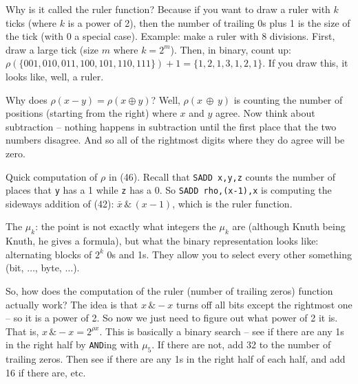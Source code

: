 \vskip 0.08in \noindent [p 140] Why is it called the ruler function?\hfil\break
Because if you want to draw a ruler with $k$ ticks (where $k$ is
a power of 2), then the number of trailing 0s plus 1 is the size of the
tick (with 0 a special case).  Example: make a ruler with 8
divisions. First, draw a large tick (size $m$ where $k = 2^m$).  
Then, in binary, count up:
$\rho\left(\{001, 010, 011, 100, 101, 110, 111\}\right) + 1 = 
\{1, 2, 1, 3, 1, 2, 1\}$.  If you draw this, it looks like, well,
a ruler. 

\vskip 0.08in \noindent [p 140] Why does $\rho\left(x - y\right) = 
\rho\left(x \oplus y \right)$? \hfil\break
Well, $\rho \left(x \, \oplus \, y\right)$ is counting the number of
positions (starting from the right) where $x$ and $y$ agree.
Now think about subtraction -- nothing happens in subtraction
until the first place that the two numbers disagree.  And so
all of the rightmost digits where they do agree will be zero.

\vskip 0.08in \noindent [p 141] Quick computation of $\rho$ in (46).
\hfil\break
Recall that {\tt SADD x,y,z} counts the number of places that
{\tt y} has a 1 while {\tt z} has a 0.  So {\tt SADD rho,(x-1),x}
is computing the sideways addition of (42): $\bar x \, \& \, 
\left(x - 1\right)$, which is the ruler function.

\vskip 0.08in \noindent [p 141] The $\mu_k$: the point is not 
exactly what integers the $\mu_k$ are (although Knuth being
Knuth, he gives a formula), but what the binary representation
looks like: alternating blocks of $2^k$ 0s and 1s.  They allow
you to select every other something (bit, $\ldots$, byte, $\ldots$).

\vskip 0.08in \noindent [p 141] So, how does the computation
of the ruler (number of trailing zeros) function actually work?
\hfil\break The idea
is that $x\, \& -x$ turns off all bits except the rightmost one --
so it is a power of 2.  So now we just need to figure
out what power of 2 it is.  That is, $x\, \& -x = 2^{\rho x}$.
This is basically a binary search -- see if there are any 1s
in the right half by {\tt AND}ing with $\mu_5$.  If there are not,
add 32 to the number of trailing zeros.  Then see if there are any
1s in the right half of each half, and add 16 if there are, etc.

